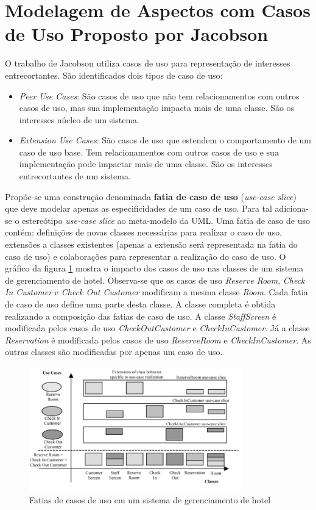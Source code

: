 \section{Modelagem de Aspectos com Casos de Uso Proposto por Jacobson}

O trabalho de Jacobson \cite{Jacobson:2004:ASD:1062430} utiliza casos de uso para representação de interesses entrecortantes. São identificados dois
tipos de caso de uso:

\begin{itemize}
  \item \textit{Peer Use Cases}: São casos de uso que não tem relacionamentos com outros casos de uso, mas sua implementação impacta mais de uma
  classe. São os interesses núcleo de um sistema.
  \item \textit{Extension Use Cases}: São casos de uso que estendem o comportamento de um caso de uso base. Tem relacionamentos com outros casos de
  uso e sua implementação pode impactar mais de uma classe. São os interesses entrecortantes de um sistema.
\end{itemize}

Propõe-se uma construção denominada \textbf{fatia de caso de uso} (\textit{use-case slice}) que deve modelar apenas as especificidades de um 
caso de uso. Para tal adiciona-se o estereótipo \textit{use-case slice} ao meta-modelo da UML. Uma fatia de caso de uso contém: definições de novas
classes necessárias para realizar o caso de uso, extensões a classes existentes (apenas a extensão será representada na fatia do caso de uso) e
colaborações para representar a realização do caso de uso. O gráfico da figura \ref{fig:jacobson_slices} mostra o impacto dos casos de uso nas classes
de um sistema de gerenciamento de hotel. Observa-se que os casos de uso \textit{Reserve Room}, \textit{Check In Customer} e \textit{Check Out
Customer} modificam a mesma classe \textit{Room}. Cada fatia de caso de uso define uma parte desta classe. A classe completa é obtida realizando a
composição das fatias de caso de uso. A classe \textit{StaffScreen} é modificada pelos casos de uso \textit{CheckOutCustomer} e
\textit{CheckInCustomer}. Já a classe \textit{Reservation} é modificada pelos casos de uso \textit{ReserveRoom} e \textit{CheckInCustomer}. As outras
classes são modificadas por apenas um caso de uso.

\begin{figure}
	\centering
	\includegraphics[width=350px]{img/jacobson_slices.png}
	\caption{Fatias de casos de uso em um sistema de
	gerenciamento de hotel}\label{fig:jacobson_slices}
\end{figure}

